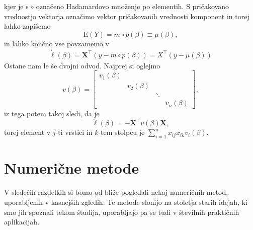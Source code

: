 \documentclass[12pt,a4paper]{amsart}
\theoremstyle{definition} %
\theoremstyle{plain} %
\begin{document}
kjer je s $\circ$ označeno Hadamardovo množenje po elementih.
S pričakovano vrednostjo vektorja označimo vektor pričakovanih vrednosti komponent in torej lahko zapišemo
\begin{equation}
    \mathrm{E}(Y) = m \circ p(\beta) \equiv \mu(\beta),
\end{equation}
in lahko končno vse povzamemo v
\begin{align}\label{prvi}
    \dot{\ell}(\beta) = \mathbf{X}^\top(y - m \circ p(\beta)) = X^\top(y - \mu(\beta))
\end{align}
Ostane nam le še dvojni odvod. Najprej si oglejmo
\[
    v(\beta) = \begin{bmatrix}
        v_{1}(\beta)  & & &\\
        & v_{2}(\beta) & & \\
        & & \ddots & \\
        & & & v_{n}(\beta)
    \end{bmatrix},
\]
iz tega potem takoj sledi, da je
\begin{equation} \label{drugi}
    \ddot{\ell}(\beta) = -\mathbf{X}^\top v(\beta)\mathbf{X},
\end{equation}
torej element v $j$-ti vrstici in $k$-tem stolpcu je $\sum_{i=1}^{n}x_{ij}x_{ik}v_{i}(\beta).$





\section{Numerične metode}
V sledečih razdelkih si bomo od bliže pogledali nekaj numeričnih metod, uporabljenih v kasnejših zgledih. Te metode slonijo na stoletja starih
idejah, ki smo jih spoznali tekom študija, uporabljajo pa se tudi v številnih praktičnih aplikacijah.
\end{document}
